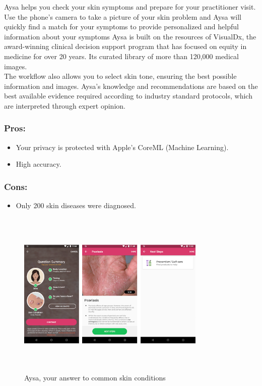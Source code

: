 Aysa helps you check your skin symptoms and prepare for your practitioner visit.
Use the phone's camera to take a picture of your skin problem and Aysa will quickly find a match for your symptoms to provide personalized and helpful information about your symptoms Aysa is built on the resources of VisualDx, the award-winning clinical decision support program that has focused on equity in medicine for over 20 years. Its curated library of more than 120,000 medical images.\\

The workflow also allows you to select skin tone, ensuring the best possible information and images.
Aysa's knowledge and recommendations are based on the best available evidence required according to industry standard protocols, which are interpreted through expert opinion.
 \subsubsection{Pros:}
 \begin{itemize}
     \item Your privacy is protected with Apple's CoreML (Machine Learning).\\
     \item High accuracy.\\
 \end{itemize}
\subsubsection{Cons:}
\begin{itemize}
     \item Only 200 skin diseases were diagnosed.\\
\end{itemize}
\begin{figure}[H]
 \centering 
 \includegraphics[height= 8cm, width=9cm]{backmatter/figures/Aysa.PNG}
 \caption{Aysa, your answer to common skin conditions}
 \end{figure}
\newpage
